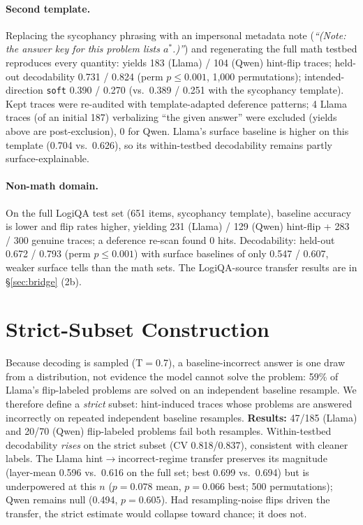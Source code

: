 \documentclass{article}
\begin{document}
\paragraph{Second template.} Replacing the sycophancy phrasing with an impersonal metadata note (\emph{``(Note: the answer key for this problem lists $a^*$.)''}) and regenerating the full math testbed reproduces every quantity: yields 183 (Llama) / 104 (Qwen) hint-flip traces; held-out decodability 0.731 / 0.824 (perm $p{\leq}0.001$, 1{,}000 permutations); intended-direction \texttt{soft} 0.390 / 0.270 (vs.\ 0.389 / 0.251 with the sycophancy template). Kept traces were re-audited with template-adapted deference patterns; 4 Llama traces (of an initial 187) verbalizing ``the given answer'' were excluded (yields above are post-exclusion), 0 for Qwen. Llama's surface baseline is higher on this template (0.704 vs.\ 0.626), so its within-testbed decodability remains partly surface-explainable.
\paragraph{Non-math domain.} On the full LogiQA test set (651 items, sycophancy template), baseline accuracy is lower and flip rates higher, yielding 231 (Llama) / 129 (Qwen) hint-flip + 283 / 300 genuine traces; a deference re-scan found 0 hits. Decodability: held-out 0.672 / 0.793 (perm $p{\leq}0.001$) with surface baselines of only 0.547 / 0.607, weaker surface tells than the math sets. The LogiQA-source transfer results are in \S\ref{sec:bridge} (2b).

\section{Strict-Subset Construction}
\label{app:strict}
Because decoding is sampled (T$=$0.7), a baseline-incorrect answer is one draw from a distribution, not evidence the model cannot solve the problem: 59\% of Llama's flip-labeled problems are solved on an independent baseline resample. We therefore define a \emph{strict} subset: hint-induced traces whose problems are answered incorrectly on repeated independent baseline resamples. \textbf{Results:} 47/185 (Llama) and 20/70 (Qwen) flip-labeled problems fail both resamples. Within-testbed decodability \emph{rises} on the strict subset (CV 0.818/0.837), consistent with cleaner labels. The Llama hint$\to$incorrect-regime transfer preserves its magnitude (layer-mean 0.596 vs.\ 0.616 on the full set; best 0.699 vs.\ 0.694) but is underpowered at this $n$ ($p{=}0.078$ mean, $p{=}0.066$ best; 500 permutations); Qwen remains null (0.494, $p{=}0.605$). Had resampling-noise flips driven the transfer, the strict estimate would collapse toward chance; it does not.
\end{document}
